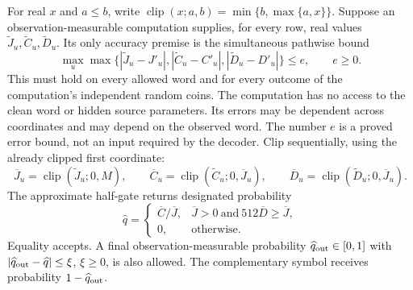For real $x$ and $a\le b$, write
$\operatorname{clip}(x;a,b)=\min\{b,\max\{a,x\}\}$.
Suppose an observation-measurable computation supplies, for every row,
real values $\widetilde J_u,\widetilde C_u,\widetilde D_u$.  Its only
accuracy premise is the simultaneous pathwise bound
\begin{equation}\label{eq:a-stat-error}
 \max_u\max\{
 |\widetilde J_u-J'_u|,
 |\widetilde C_u-C'_u|,
 |\widetilde D_u-D'_u|\}\le e,
 \qquad e\ge0.
\end{equation}
This must hold on every allowed word and for every outcome of the
computation's independent random coins.  The computation has no access
to the clean word or hidden source parameters.  Its errors may be
dependent across coordinates and may depend on the observed word.
The number $e$ is a proved error bound, not an input required by the
decoder.  Clip sequentially, using the already clipped first coordinate:
\begin{equation}\label{eq:a-sequential-clip}
 \overline J_u=\operatorname{clip}(\widetilde J_u;0,M),\qquad
 \overline C_u=\operatorname{clip}(\widetilde C_u;0,\overline J_u),\qquad
 \overline D_u=\operatorname{clip}(\widetilde D_u;0,\overline J_u).
\end{equation}
The approximate half-gate returns designated probability
\begin{equation}\label{eq:a-gate}
 \widehat q=
 \begin{cases}
 \overline C/\overline J,
       &\overline J>0\ \text{and}\ 512\overline D\ge\overline J,\\
 0,&\text{otherwise}.
 \end{cases}
\end{equation}
Equality accepts.  A final observation-measurable probability
$\widehat q_{\rm out}\in[0,1]$ with
$|\widehat q_{\rm out}-\widehat q|\le\xi$, $\xi\ge0$, is also allowed.
The complementary symbol receives probability $1-\widehat q_{\rm out}$.

